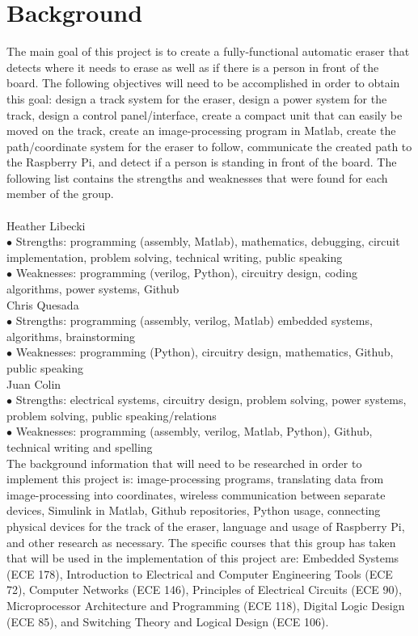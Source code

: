 \documentclass{IEEEtran}					%
\begin{document}
	\section{Background}
	The main goal of this project is to create a fully-functional automatic eraser that detects where it needs to erase as well as if there is a person in front of the board. The following objectives will need to be accomplished in order to obtain this goal: design a track system for the eraser, design a power system for the track, design a control panel/interface, create a compact unit that can easily be moved on the track, create an image-processing program in Matlab, create the path/coordinate system for the eraser to follow, communicate the created path to the Raspberry Pi, and detect if a person is standing in front of the board.
	The following list contains the strengths and weaknesses that were found for each member of the group.\\\\
	Heather Libecki \\
	$\bullet$ Strengths: programming (assembly, Matlab), mathematics, debugging, circuit implementation, problem solving, technical writing, public speaking\\
	$\bullet$ Weaknesses: programming (verilog, Python), circuitry design, coding algorithms, power systems, Github\\
	Chris Quesada\\
	$\bullet$ Strengths: programming (assembly, verilog, Matlab) embedded systems, algorithms, brainstorming\\
	$\bullet$ Weaknesses: programming (Python), circuitry design, mathematics, Github, public speaking\\
	Juan Colin\\
	$\bullet$ Strengths: electrical systems, circuitry design, problem solving, power systems, problem solving, public speaking/relations\\
	$\bullet$ Weaknesses: programming (assembly, verilog, Matlab, Python), Github, technical writing and spelling\\
	The background information that will need to be researched in order to implement this project is: image-processing programs, translating data from image-processing into coordinates, wireless communication between separate devices, Simulink in Matlab, Github repositories, Python usage, connecting physical devices for the track of the eraser, language and usage of Raspberry Pi, and other research as necessary. The specific courses that this group has taken that will be used in the implementation of this project are: Embedded Systems (ECE 178), Introduction to Electrical and Computer Engineering Tools (ECE 72), Computer Networks (ECE 146), Principles of Electrical Circuits (ECE 90), Microprocessor Architecture and Programming (ECE 118), Digital Logic Design (ECE 85), and Switching Theory and Logical Design (ECE 106).
	
\end{document}
